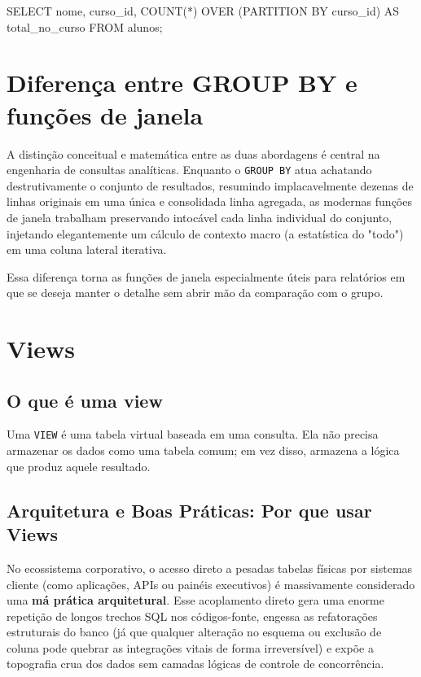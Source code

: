\begin{sqlcode}
SELECT
    nome,
    curso_id,
    COUNT(*) OVER (PARTITION BY curso_id) AS total_no_curso
FROM alunos;
\end{sqlcode}

\section{Diferença entre GROUP BY e funções de janela}

A distinção conceitual e matemática entre as duas abordagens é central na engenharia de consultas analíticas. Enquanto o \texttt{GROUP BY} atua achatando destrutivamente o conjunto de resultados, resumindo implacavelmente dezenas de linhas originais em uma única e consolidada linha agregada, as modernas funções de janela trabalham preservando intocável cada linha individual do conjunto, injetando elegantemente um cálculo de contexto macro (a estatística do "todo") em uma coluna lateral iterativa.

Essa diferença torna as funções de janela especialmente úteis para relatórios em que se deseja manter o detalhe sem abrir mão da comparação com o grupo.

\section{Views}

\subsection{O que é uma view}

Uma \texttt{VIEW} é uma tabela virtual baseada em uma consulta. Ela não precisa armazenar os dados como uma tabela comum; em vez disso, armazena a lógica que produz aquele resultado.

\subsection{Arquitetura e Boas Práticas: Por que usar Views}

No ecossistema corporativo, o acesso direto a pesadas tabelas físicas por sistemas cliente (como aplicações, APIs ou painéis executivos) é massivamente considerado uma \textbf{má prática arquitetural}. Esse acoplamento direto gera uma enorme repetição de longos trechos SQL nos códigos-fonte, engessa as refatorações estruturais do banco (já que qualquer alteração no esquema ou exclusão de coluna pode quebrar as integrações vitais de forma irreversível) e expõe a topografia crua dos dados sem camadas lógicas de controle de concorrência.

